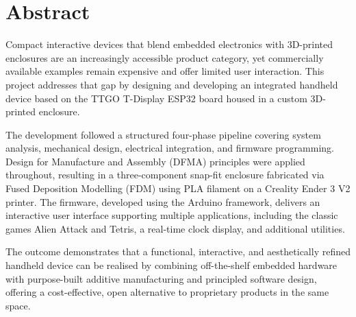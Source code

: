 \section*{\Huge Abstract}

Compact interactive devices that blend embedded electronics with 3D-printed enclosures are an increasingly accessible product category, yet commercially available examples remain expensive and offer limited user interaction. This project addresses that gap by designing and developing an integrated handheld device based on the TTGO T-Display ESP32 board housed in a custom 3D-printed enclosure.

The development followed a structured four-phase pipeline covering system analysis, mechanical design, electrical integration, and firmware programming. Design for Manufacture and Assembly (DFMA) principles were applied throughout, resulting in a three-component snap-fit enclosure fabricated via Fused Deposition Modelling (FDM) using PLA filament on a Creality Ender 3 V2 printer. The firmware, developed using the Arduino framework, delivers an interactive user interface supporting multiple applications, including the classic games Alien Attack and Tetris, a real-time clock display, and additional utilities.

The outcome demonstrates that a functional, interactive, and aesthetically refined handheld device can be realised by combining off-the-shelf embedded hardware with purpose-built additive manufacturing and principled software design, offering a cost-effective, open alternative to proprietary products in the same space.